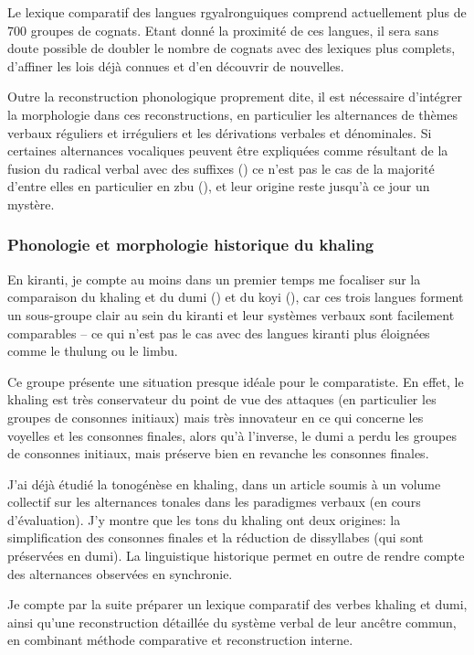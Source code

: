 \documentclass[oldfontcommands,oneside,a4paper,11pt]{article}
\begin{document}
Le lexique comparatif des langues rgyalronguiques comprend actuellement plus de 700 groupes de cognats. Etant donné la proximité de ces langues, il sera sans doute possible de doubler le nombre de cognats avec des lexiques plus complets,  d'affiner les lois déjà connues et d'en découvrir de nouvelles. 

Outre la reconstruction phonologique proprement dite, il est nécessaire d'intégrer la morphologie dans ces reconstructions, en particulier les alternances de thèmes verbaux réguliers et irréguliers et les dérivations verbales et dénominales. Si certaines alternances vocaliques peuvent être expliquées comme résultant de la fusion du radical verbal avec des suffixes (\citealt[357-8]{jacques04these}) ce n'est pas le cas de la majorité d'entre elles en particulier en zbu (\citealt{jackson04showu}), et leur origine reste jusqu'à ce jour un mystère.

\subsubsection{Phonologie et morphologie historique du khaling}
En kiranti, je compte au moins dans un premier temps me focaliser sur la comparaison du khaling et du dumi (\citealt{driem93dumi}) et du koyi (\citealt{lahaussois09}), car ces trois langues forment un sous-groupe clair au sein du kiranti et leur systèmes verbaux sont facilement comparables -- ce qui n'est pas le cas avec des langues kiranti plus éloignées comme le thulung ou le limbu.

Ce groupe présente une situation presque idéale pour le comparatiste. En effet, le khaling est très conservateur du point de vue des attaques (en particulier les groupes de consonnes initiaux) mais très innovateur en ce qui concerne les voyelles et les consonnes finales, alors qu'à l'inverse, le dumi a perdu les groupes de consonnes initiaux, mais préserve bien en revanche les consonnes finales. 


J'ai déjà étudié la tonogénèse en khaling, dans un article soumis à un volume collectif sur les alternances tonales dans les paradigmes verbaux (en cours d'évaluation). J'y montre que les tons du khaling ont deux origines: la simplification des consonnes finales et la réduction de dissyllabes (qui sont préservées en dumi). La linguistique historique permet en outre de rendre compte des alternances observées en synchronie.

Je compte par la suite préparer un lexique comparatif des verbes khaling et dumi, ainsi qu'une reconstruction détaillée du système verbal de leur ancêtre commun, en combinant méthode comparative et reconstruction interne.
\end{document}
